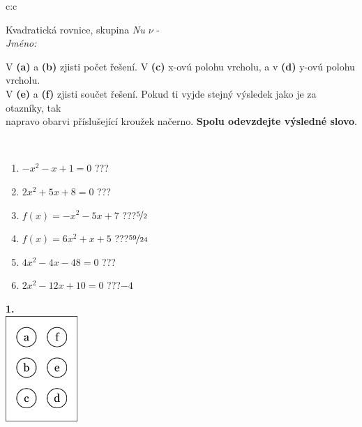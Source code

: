 \documentclass[10pt]{report}
\begin{document}
\begin{tabular}{c:c}
\begin{minipage}[c][104.5mm][t]{0.5\linewidth}
\begin{center}
\vspace{7mm}
{\huge Kvadratická rovnice, skupina \textit{Nu $\nu$} -}\\[5mm]
\textit{Jméno:}\phantom{xxxxxxxxxxxxxxxxxxxxxxxxxxxxxxxxxxxxxxxxxxxxxxxxxxxxxxxxxxxxxxxxx}\\[5mm]
\begin{minipage}{0.95\linewidth}
\begin{center}
V \textbf{(a)} a \textbf{(b)} zjisti počet řešení. V \textbf{(c)} x-ovú polohu vrcholu, a v \textbf{(d)} y-ovú polohu vrcholu.\\V \textbf{(e)} a \textbf{(f)} zjisti součet řešení. Pokud ti vyjde stejný výsledek jako je za otazníky, tak\\napravo obarvi příslušející kroužek načerno. \textbf{Spolu odevzdejte výsledné slovo}.
\end{center}
\end{minipage}
\\[1mm]
\begin{minipage}{0.79\linewidth}
\begin{center}
\begin{varwidth}{\linewidth}
\begin{enumerate}
\Large
\item $-x^2-x+1=0$\quad \dotfill\; ???\;\dotfill {}
\item $2x^2+5x+8=0$\quad \dotfill\; ???\;\dotfill {}
\item $f(x)=-x^2-5x+7$\quad \dotfill\; ???\;\dotfill \quad $\nicefrac{5}{2}$
\item $f(x)=6x^2+x+5$\quad \dotfill\; ???\;\dotfill \quad $\nicefrac{59}{24}$
\item $4x^2-4x-48=0$\quad \dotfill\; ???\;\dotfill {}
\item $2x^2-12x+10=0$\quad \dotfill\; ???\;\dotfill \quad $-4$
\end{enumerate}
\end{varwidth}
\end{center}
\end{minipage}
\begin{minipage}{0.20\linewidth}
\begin{center}
{\Huge\bfseries 1.} \\[2mm]
\includegraphics[height=40mm]{../images/braille.png}

\end{center}
\end{minipage}
\end{center}
\end{minipage}
\end{tabular}
\end{document}
